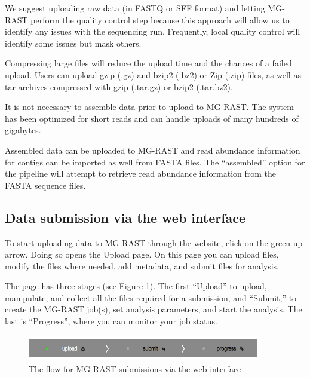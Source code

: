 \documentclass[12pt,fullpage]{report}
\begin{document}
We suggest uploading raw data (in FASTQ or SFF format) and letting MG-RAST perform the quality control step because
this approach will allow us to identify any issues with the sequencing run. Frequently, local quality control will identify some
issues but mask others.

Compressing large files will reduce the upload time and the chances of a failed upload. Users can upload gzip (.gz) and bzip2 (.bz2) or Zip (.zip) files, as well as tar archives compressed with gzip (.tar.gz) or bzip2 (.tar.bz2). 

It is not necessary to assemble data prior to upload to MG-RAST. The system has been optimized for short reads and can handle uploads of many hundreds of gigabytes.

Assembled data can be uploaded to MG-RAST and read abundance information for contigs can be imported as well from FASTA files.
The ``assembled'' option for the pipeline will attempt to retrieve read abundance information from the FASTA sequence files.
\subsection{Data submission via the web interface}

To start uploading data to MG-RAST through the website, click on the green up arrow. Doing so opens the Upload page. On this page you can upload files, modify the files where needed, add metadata, and submit files for analysis.

The page has three stages (see Figure \ref{fig:submission_stages}). The first “Upload” to upload, manipulate, and collect all the files required for a submission, and “Submit,” to create the MG-RAST job(s), set analysis parameters, and start the analysis. The last is “Progress”, where you can monitor your job status.
\begin{figure}
\begin{center} 
\includegraphics[width=4in]{Images/submission_stages.png} 
\end{center} 
\label{fig:submission_stages} 
\caption{The flow for MG-RAST submissions via the web interface}
\end{figure}
\end{document}
